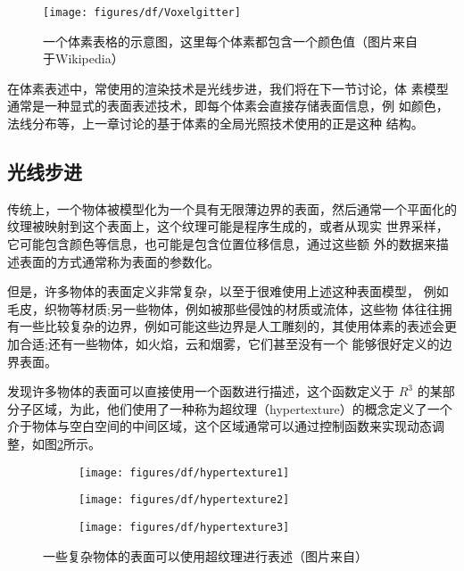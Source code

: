 \begin{figure}
	\sidecaption
	\texttt{[image: figures/df/Voxelgitter]}
	\caption{一个体素表格的示意图，这里每个体素都包含一个颜色值（图片来自于Wikipedia）}
	\label{f:df-Voxelgitter}
\end{figure}

在体素表述中，常使用的渲染技术是光线步进，我们将在下一节讨论，体 素模型通常是一种显式的表面表述技术，即每个体素会直接存储表面信息，例 如颜色，法线分布等，上一章讨论的基于体素的全局光照技术使用的正是这种 结构。




\subsection{光线步进}
传统上，一个物体被模型化为一个具有无限薄边界的表面，然后通常一个平面化的纹理被映射到这个表面上，这个纹理可能是程序生成的，或者从现实 世界采样，它可能包含颜色等信息，也可能是包含位置位移信息，通过这些额 外的数据来描述表面的方式通常称为表面的参数化。

但是，许多物体的表面定义非常复杂，以至于很难使用上述这种表面模型， 例如毛皮，织物等材质;另一些物体，例如被那些侵蚀的材质或流体，这些物 体往往拥有一些比较复杂的边界，例如可能这些边界是人工雕刻的，其使用体素的表述会更加合适;还有一些物体，如火焰，云和烟雾，它们甚至没有一个 能够很好定义的边界表面。

\cite{a:hypetrtexture}发现许多物体的表面可以直接使用一个函数进行描述，这个函数定义于 $R^{3}$ 的某部分子区域，为此，他们使用了一种称为超纹理（hypertexture）的概念定义了一个介于物体与空白空间的中间区域，这个区域通常可以通过控制函数来实现动态调整，如图\ref{f:df-hypetrtexture}所示。

\begin{figure}
	\begin{subfigure}[b]{0.32\textwidth}
		\texttt{[image: figures/df/hypertexture1]}
	\end{subfigure}
	\begin{subfigure}[b]{0.32\textwidth}
		\texttt{[image: figures/df/hypertexture2]}
	\end{subfigure}
	\begin{subfigure}[b]{0.32\textwidth}
		\texttt{[image: figures/df/hypertexture3]}
	\end{subfigure}
	\caption{一些复杂物体的表面可以使用超纹理进行表述（图片来自\cite{a:hypetrtexture}）}
	\label{f:df-hypetrtexture}
\end{figure}

